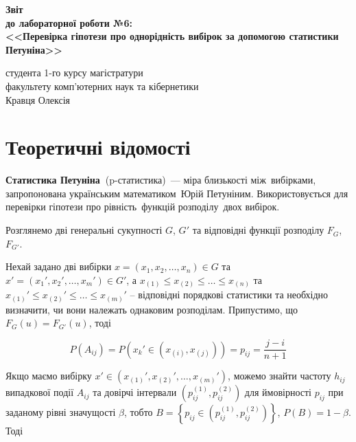 \documentclass[a4paper,12pt]{article}
\begin{document}
	
	\begin{titlepage}
		\vspace*{6cm}
		\begin{center}
			
			\large
			\textbf{Звіт}\\
			\textbf{до лабораторної роботи №6:}\\
			\textbf{<<Перевірка гіпотези про однорідність вибірок за допомогою статистики Петуніна>>}
			
		\end{center}
		
		\vspace{8cm}
		\begin{flushright}
			студента 1-го курсу магістратури\\
			факультету комп'ютерних наук та кібернетики\\
			Кравця Олексія
		\end{flushright}
		
	\end{titlepage}

\newpage
\tableofcontents
\newpage

\section{Теоретичні відомості}

\textbf{Статистика Петуніна }(p-статистика) — міра близькості між вибірками, запропонована українським математиком Юрій Петуніним. Використовується для перевірки гіпотези про рівність функцій розподілу двох вибірок.

Розглянемо дві генеральні сукупності $G$, $G'$ та відповідні функції розподілу $F_G$, $F_{G'}$. 

Нехай задано дві вибірки $x = (x_1, x_2 , \ldots, x_n) \in G$ та $x' = (x_1', x_2', \ldots, x_m') \in G'$, а $x_{(1)} \le x_{(2)} \le \ldots \le x_{(n)}$ та $x_{(1)}' \le x_{(2)}' \le \ldots \le x_{(m)}'$ -- відповідні порядкові статистики  та необхідно визначити, чи вони належать однаковим розподілам. Припустимо, що $F_G(u) = F_{G'}(u)$, тоді

\[
	P(A_{ij}) = P \left(x_k' \in (x_{(i)}, x_{(j)}) \right) = p_{ij} = \frac{j-i}{n+1}
\]

Якщо маємо вибірку $x' \in (x_{(1)}', x_{(2)}', \ldots, x_{(m)}' )$, можемо знайти частоту $h_{ij}$ випадкової події $A_{ij}$ та довірчі інтервали $(p_{ij}^{(1)},p_{ij}^{(2)})$ для ймовірності $p_{ij}$ при заданому рівні значущості $\beta$, тобто $B = \left\{ p_{ij} \in (p_{ij}^{(1)},p_{ij}^{(2)})\right\}$, $P(B) = 1 - \beta$. Тоді
\end{document}
